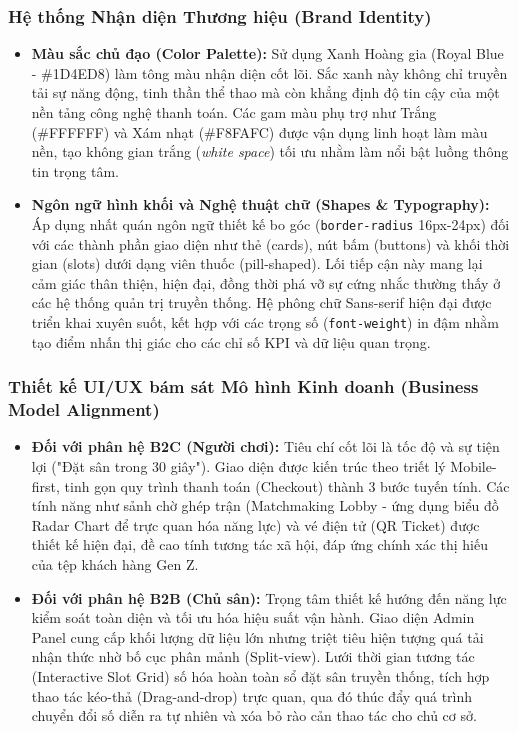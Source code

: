 \subsubsection{Hệ thống Nhận diện Thương hiệu (Brand Identity)}
\begin{itemize}
    \item \textbf{Màu sắc chủ đạo (Color Palette):} Sử dụng Xanh Hoàng gia (Royal Blue - \#1D4ED8) làm tông màu nhận diện cốt lõi. Sắc xanh này không chỉ truyền tải sự năng động, tinh thần thể thao mà còn khẳng định độ tin cậy của một nền tảng công nghệ thanh toán. Các gam màu phụ trợ như Trắng (\#FFFFFF) và Xám nhạt (\#F8FAFC) được vận dụng linh hoạt làm màu nền, tạo không gian trắng (\textit{white space}) tối ưu nhằm làm nổi bật luồng thông tin trọng tâm.
    \item \textbf{Ngôn ngữ hình khối và Nghệ thuật chữ (Shapes \& Typography):} Áp dụng nhất quán ngôn ngữ thiết kế bo góc (\texttt{border-radius} 16px-24px) đối với các thành phần giao diện như thẻ (cards), nút bấm (buttons) và khối thời gian (slots) dưới dạng viên thuốc (pill-shaped). Lối tiếp cận này mang lại cảm giác thân thiện, hiện đại, đồng thời phá vỡ sự cứng nhắc thường thấy ở các hệ thống quản trị truyền thống. Hệ phông chữ Sans-serif hiện đại được triển khai xuyên suốt, kết hợp với các trọng số (\texttt{font-weight}) in đậm nhằm tạo điểm nhấn thị giác cho các chỉ số KPI và dữ liệu quan trọng.
\end{itemize}

\subsubsection{Thiết kế UI/UX bám sát Mô hình Kinh doanh (Business Model Alignment)}
\begin{itemize}
    \item \textbf{Đối với phân hệ B2C (Người chơi):} Tiêu chí cốt lõi là tốc độ và sự tiện lợi ("Đặt sân trong 30 giây"). Giao diện được kiến trúc theo triết lý Mobile-first, tinh gọn quy trình thanh toán (Checkout) thành 3 bước tuyến tính. Các tính năng như sảnh chờ ghép trận (Matchmaking Lobby - ứng dụng biểu đồ Radar Chart để trực quan hóa năng lực) và vé điện tử (QR Ticket) được thiết kế hiện đại, đề cao tính tương tác xã hội, đáp ứng chính xác thị hiếu của tệp khách hàng Gen Z.
    \item \textbf{Đối với phân hệ B2B (Chủ sân):} Trọng tâm thiết kế hướng đến năng lực kiểm soát toàn diện và tối ưu hóa hiệu suất vận hành. Giao diện Admin Panel cung cấp khối lượng dữ liệu lớn nhưng triệt tiêu hiện tượng quá tải nhận thức nhờ bố cục phân mảnh (Split-view). Lưới thời gian tương tác (Interactive Slot Grid) số hóa hoàn toàn sổ đặt sân truyền thống, tích hợp thao tác kéo-thả (Drag-and-drop) trực quan, qua đó thúc đẩy quá trình chuyển đổi số diễn ra tự nhiên và xóa bỏ rào cản thao tác cho chủ cơ sở.
\end{itemize}

